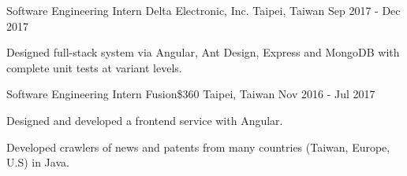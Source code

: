 \begin{cventries}
  \cventry
    {Software Engineering Intern} %
    {Delta Electronic, Inc.} %
    {Taipei, Taiwan} %
    {Sep 2017 - Dec 2017} %
    {
      \begin{cvitems} %
        \item {Designed full-stack system via Angular, Ant Design, Express and MongoDB with complete unit tests at variant levels.}
      \end{cvitems}
    }

  \cventry
    {Software Engineering Intern} %
    {Fusion\$360} %
    {Taipei, Taiwan} %
    {Nov 2016 - Jul 2017} %
    {
      \begin{cvitems} %
        \item {Designed and developed a frontend service with Angular.}
        \item {Developed crawlers of news and patents from many countries (Taiwan, Europe, U.S) in Java.}
      \end{cvitems}
    }

\end{cventries}
